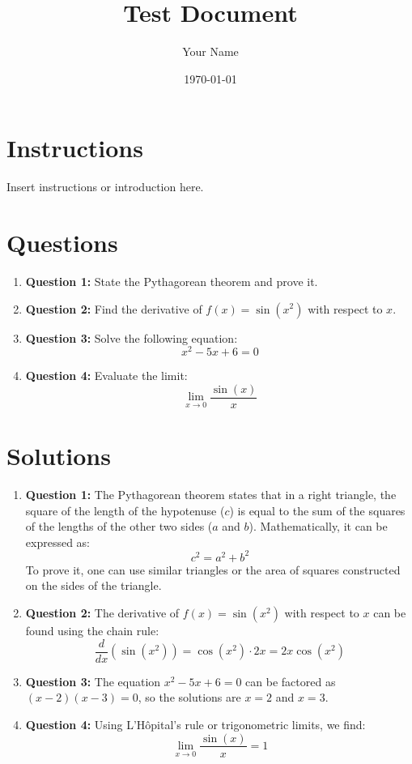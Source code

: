 \documentclass{article}
\begin{document}
\title{Test Document}
\author{Your Name}
\date{\today}
\maketitle

\section{Instructions}
Insert instructions or introduction here.

\section{Questions}
\begin{enumerate}
    \item \textbf{Question 1:} State the Pythagorean theorem and prove it.
    
    \item \textbf{Question 2:} Find the derivative of $f(x) = \sin(x^2)$ with respect to $x$.
    
    \item \textbf{Question 3:} Solve the following equation:
    \[
    x^2 - 5x + 6 = 0
    \]
    
    \item \textbf{Question 4:} Evaluate the limit:
    \[
    \lim_{x \to 0} \frac{\sin(x)}{x}
    \]
\end{enumerate}

\section{Solutions}
\begin{enumerate}
    \item \textbf{Question 1:} The Pythagorean theorem states that in a right triangle, the square of the length of the hypotenuse ($c$) is equal to the sum of the squares of the lengths of the other two sides ($a$ and $b$). Mathematically, it can be expressed as:
    \[
    c^2 = a^2 + b^2
    \]
    To prove it, one can use similar triangles or the area of squares constructed on the sides of the triangle.
    
    \item \textbf{Question 2:} The derivative of $f(x) = \sin(x^2)$ with respect to $x$ can be found using the chain rule:
    \[
    \frac{d}{dx}\left(\sin(x^2)\right) = \cos(x^2) \cdot 2x = 2x\cos(x^2)
    \]
    
    \item \textbf{Question 3:} The equation $x^2 - 5x + 6 = 0$ can be factored as $(x - 2)(x - 3) = 0$, so the solutions are $x = 2$ and $x = 3$.
    
    \item \textbf{Question 4:} Using L'Hôpital's rule or trigonometric limits, we find:
    \[
    \lim_{x \to 0} \frac{\sin(x)}{x} = 1
    \]
\end{enumerate}
\end{document}
